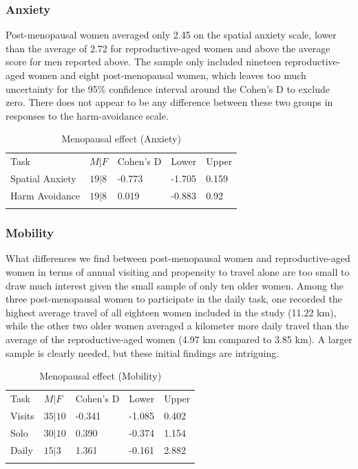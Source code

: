 		\subsubsection{Anxiety}
		\label{sec:3.2.2}
Post-menopausal women averaged only 2.45 on the spatial anxiety scale, lower than the average of 2.72 for reproductive-aged women and above the average score for men reported above.  The sample only included nineteen reproductive-aged women and eight post-menopausal women, which leaves too much uncertainty for the 95\% confidence interval around the Cohen's D to exclude zero.  There does not appear to be any difference between these two groups in responses to the harm-avoidance scale.  

\begin{table}[h!]
\caption{Menopausal effect (Anxiety)}
\label{tab:fert_anx}  
\begin{tabular}{lllll}
\hline\noalign{\smallskip}
Task & $M|F$ & Cohen's D & Lower & Upper  \\
\noalign{\smallskip}\hline\noalign{\smallskip}
Spatial Anxiety & $19|8$ & -0.773 & -1.705 & \phantom{-}0.159 \\
Harm Avoidance & $19|8$ & \phantom{-}0.019 & -0.883  & \phantom{-}0.92 \\
\noalign{\smallskip}\hline
\end{tabular}
\end{table}

		\subsubsection{Mobility}
		\label{sec:3.2.3}
What differences we find between post-menopausal women and reproductive-aged women in terms of annual visiting and propensity to travel alone are too small to draw much interest given the small sample of only ten older women.  Among the three post-menopausal women to participate in the daily task, one recorded the highest average travel of all eighteen women included in the study (11.22 km), while the other two older women averaged a kilometer more daily travel than the average of the reproductive-aged women (4.97 km compared to 3.85 km).  A larger sample is clearly needed, but these initial findings are intriguing.  

\begin{table}[h!]
\caption{Menopausal effect (Mobility)}
\label{tab:fert_mob}  
\begin{tabular}{lllll}
\hline\noalign{\smallskip}
Task & $M|F$ & Cohen's D & Lower & Upper  \\
\noalign{\smallskip}\hline\noalign{\smallskip}
Visits & $35|10$ & -0.341 & -1.085 & \phantom{-}0.402 \\
Solo & $30|10$ & \phantom{-}0.390 & -0.374 & \phantom{-}1.154 \\
Daily & $15|3$ & \phantom{-}1.361 & -0.161 & \phantom{-}2.882 \\
\noalign{\smallskip}\hline
\end{tabular}
\end{table}

